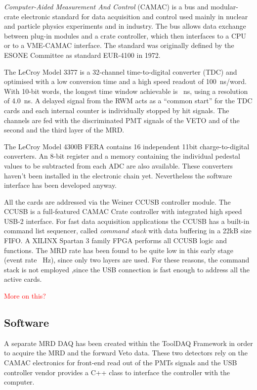\emph{Computer-Aided Measurement And Control} (CAMAC) is a bus and modular-crate electronic %
standard for data acquisition and control used mainly in nuclear and particle physics experiments %
and in industry.
The bus allows data exchange between plug-in modules and a crate controller, %
which then interfaces to a CPU or to a VME-CAMAC interface.
The standard was originally defined by the ESONE Committee as standard EUR-4100 in 1972.

The LeCroy Model 3377 is a 32-channel time-to-digital converter (TDC) and %
optimised with a low conversion time and a high speed readout of 100~ns/word.
With 10-bit words, the longest time window achievable is ~ns, using a resolution %
of 4.0~ns.
A delayed signal from the RWM acts as a ``common start'' for the TDC cards and %
each internal counter is individually stopped by hit signals.
The channels are fed with the discriminated PMT signals of the VETO and of the second %
and the third layer of the MRD.

The LeCroy Model 4300B FERA contains 16 independent 11bit charge-to-digital converters.
An 8-bit register and a memory containing the individual pedestal values to be subtracted from %
each ADC are also available.
These converters haven't been installed in the electronic chain yet.
Nevertheless the software interface has been developed anyway.

All the cards are addressed via the Weiner CCUSB controller module. 
The CCUSB is a full-featured CAMAC Crate controller with integrated high speed USB-2 %
interface.
For fast data acquisition applications the CCUSB has a built-in command list sequencer, called %
\emph{command stack} with data buffering in a 22kB size FIFO.
A XILINX Spartan 3 family FPGA performs all CCUSB logic and functions. 
The MRD rate has been found to be quite low in this early stage (event rate ~Hz), since %
only two layers are used.
For these reasons, the command stack is not employed ,since the USB connection is fast enough %
to address all the active cards. 


\textcolor{red}{More on this?}


\subsection{Software}

A separate MRD DAQ has been created within the ToolDAQ Framework in order to acquire the MRD %
and the forward Veto data.
These two detectors rely on the CAMAC electronics for front-end read out of the PMTs %
signals and the USB controller vendor provides a C++ class to interface the controller with the %
computer.

